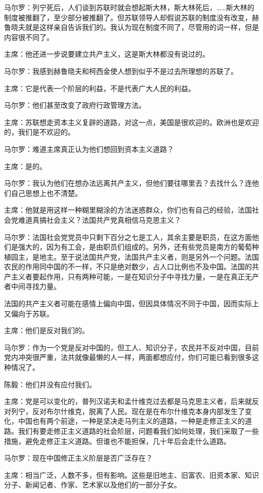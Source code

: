 马尔罗：列宁死后，人们谈到苏联时就会想起斯大林，斯大林死后，……斯大林的制度被推翻了，至少部分被推翻了。但苏联领导人却假说苏联的制度没有改变，赫鲁晓夫就是这样亲自告诉我们的。我认为现在制度不同了，尽管用的词一样，但是内容很不同了。

主席：他还进一步说要建立共产主义，这是斯大林都没有说过的。

马尔罗：我感到赫鲁晓夫和柯西金使人想到似乎不是过去所理想的苏联了。

主席：它是代表一个阶层的利益，不是代表广大人民的利益。

马尔罗：他们甚至改变了政府行政管理方法。

主席：苏联想走资本主义复辟的道路，对这一点，美国是很欢迎的。欧洲也是欢迎的，我们是不欢迎的。

马尔罗：难道主席真正认为他们想回到资本主义道路？

主席：是的。

马尔罗：我认为他们在想办法远离共产主义，但他们要往哪里去？去找什么？连他们自己思想上也不清楚。

主席：他就是用这样一种糊里糊涂的方法迷惑群众，你们也有自己的经验，法国社会党难道真搞社会主义？法国共产党真相信马克思主义？

马尔罗：法国社会党党员中只剩下百分之七是工人，其余主要是职员，在这方面他们是强大的，因为有工会，是由职员们组成的。另外，还有些党员是南方的葡萄种植园主，是地主。至于说法国共产党，法国共产主义者，则是另外一个问题。法国农民的作用同中国的不一样，不只是绝对数少，占人口比例也不及中国。法国的共产主义者要起作用，只有两种可能，一是在知识分子中寻找力量，一是在真正无产者中间寻找力量。

法国的共产主义者可能在感情上偏向中国，但因具体情况不同于中国，因而实际上又偏向于苏联。

主席：他们是反对我们的。

马尔罗：作为一个党是反对中国的，但工人、知识分子，农民并不反对中国，目前党内冲突很严重，法共就像最懒的人一样，两面都想应付，你们可能已看到很多这种情况了。

陈毅：他们并没有应付我们。

主席：党是可以变化的，普列汉诺夫和孟什维克过去都是马克思主义者，后来就反对列宁，反对布尔什维克，脱离了人民。现在是在布尔什维克本身内部发生了变化，中国也有两个前途，一种是坚决走马列主义的道路，一种是走修正主义的道路。我们有要走修正主义道路的社会阶层，问题看我们如何处理，我们采取了一些措施，避免走修正主义道路。但谁也不能担保，几十年后会走什么道路。

马尔罗：现在中国修正主义阶层是否广泛存在？

主席：相当广泛，人数不多，但有影响。这些是旧地主、旧富农、旧资本家、知识分子、新闻记者、作家、艺术家以及他们的一部分子女。

